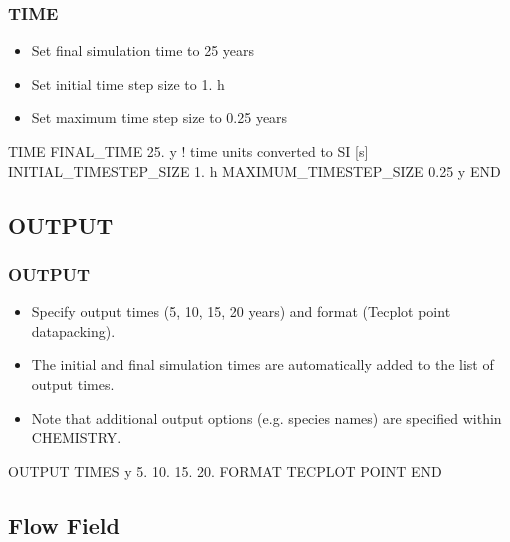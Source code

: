 \documentclass{beamer}
\newcommand\redcomment[1]{{{\color{red} #1}}}
\newcommand\bluecomment[1]{{{\color{blue} #1}}}
\begin{document}
\begin{frame}[fragile]\frametitle{TIME}

\begin{itemize}
\item Set final simulation time to 25 years
\item Set initial time step size to 1. h
\item Set maximum time step size to 0.25 years
\end{itemize}


\begin{semiverbatim}

TIME
  FINAL_TIME 25. \redcomment{y}      \bluecomment{! time units converted to SI [s]}
  INITIAL_TIMESTEP_SIZE 1. \redcomment{h}
  MAXIMUM_TIMESTEP_SIZE 0.25 \redcomment{y}
END
\end{semiverbatim}

\end{frame}

\subsection{OUTPUT}

\begin{frame}[fragile]\frametitle{OUTPUT}

\begin{itemize}
\item Specify output times (5, 10, 15, 20 years) and format (Tecplot point datapacking).
\item The initial and final simulation times are automatically added to the list of output times.
\item Note that additional output options (e.g. species names) are specified within CHEMISTRY.
\end{itemize}


\begin{semiverbatim}

OUTPUT
  TIMES \redcomment{y} 5. 10. 15. 20.
  FORMAT TECPLOT POINT
END
\end{semiverbatim}

\end{frame}

\subsection{Flow Field}
\end{document}
